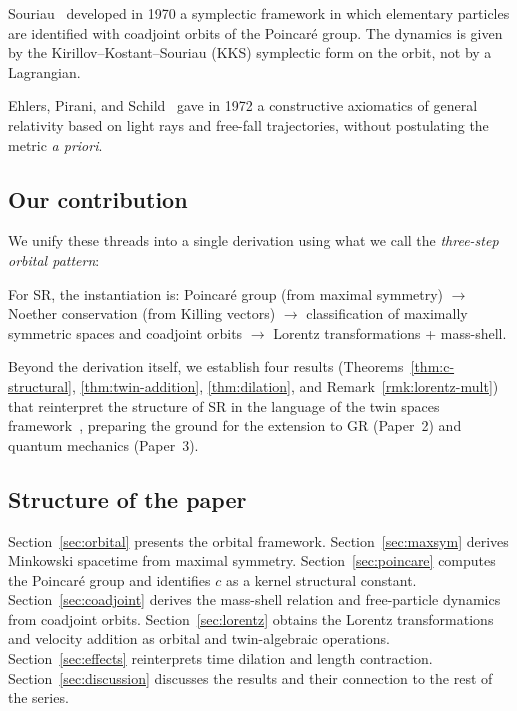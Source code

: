 \documentclass[12pt]{article}
\theoremstyle{plain}
\theoremstyle{definition}
\theoremstyle{remark}
\begin{document}
Souriau~\cite{souriau1970} developed in 1970 a symplectic framework in which elementary particles are identified with coadjoint orbits of the Poincar\'e group. The dynamics is given by the Kirillov--Kostant--Souriau (KKS) symplectic form on the orbit, not by a Lagrangian.

Ehlers, Pirani, and Schild~\cite{eps1972} gave in 1972 a constructive axiomatics of general relativity based on light rays and free-fall trajectories, without postulating the metric \emph{a priori}.

\subsection{Our contribution}

We unify these threads into a single derivation using what we call the \emph{three-step orbital pattern}:
\begin{center}
\end{center}
For SR, the instantiation is: Poincar\'e group (from maximal symmetry) $\to$ Noether conservation (from Killing vectors) $\to$ classification of maximally symmetric spaces and coadjoint orbits $\to$ Lorentz transformations + mass-shell.

Beyond the derivation itself, we establish four results (Theorems~\ref{thm:c-structural}, \ref{thm:twin-addition}, \ref{thm:dilation}, and Remark~\ref{rmk:lorentz-mult}) that reinterpret the structure of SR in the language of the twin spaces framework~\cite{nembe2026vol17}, preparing the ground for the extension to GR (Paper~2) and quantum mechanics (Paper~3).

\subsection{Structure of the paper}

Section~\ref{sec:orbital} presents the orbital framework. Section~\ref{sec:maxsym} derives Minkowski spacetime from maximal symmetry. Section~\ref{sec:poincare} computes the Poincar\'e group and identifies $c$ as a kernel structural constant. Section~\ref{sec:coadjoint} derives the mass-shell relation and free-particle dynamics from coadjoint orbits. Section~\ref{sec:lorentz} obtains the Lorentz transformations and velocity addition as orbital and twin-algebraic operations. Section~\ref{sec:effects} reinterprets time dilation and length contraction. Section~\ref{sec:discussion} discusses the results and their connection to the rest of the series.
\end{document}
